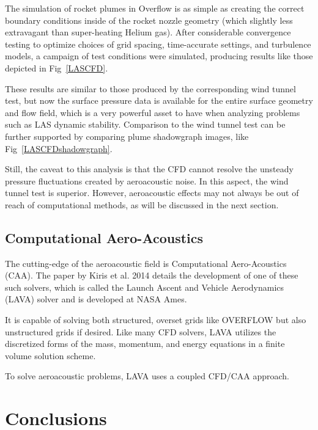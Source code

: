 \documentclass[]{aiaa-tc}%
\begin{document}
The simulation of rocket plumes in Overflow is as simple as creating the correct boundary conditions inside of the rocket nozzle geometry (which slightly less extravagant than super-heating Helium gas).  After considerable convergence testing to optimize choices of grid spacing, time-accurate settings, and turbulence models, a campaign of test conditions were simulated, producing results like those depicted in Fig~\ref{LASCFD}.

These results are similar to those produced by the corresponding wind tunnel test, but now the surface pressure data is available for the entire surface geometry and flow field, which is a very powerful asset to have when analyzing problems such as LAS dynamic stability.  Comparison to the wind tunnel test can be further supported by comparing plume shadowgraph images, like Fig~\ref{LASCFDshadowgraph}.

Still, the caveat to this analysis is that the CFD cannot resolve the unsteady pressure fluctuations created by aeroacoustic noise.  In this aspect, the wind tunnel test is superior.  However, aeroacoustic effects may not always be out of reach of computational methods, as will be discussed in the next section.

\subsection{Computational Aero-Acoustics}

The cutting-edge of the aeroacoustic field is Computational Aero-Acoustics (CAA).  The paper by Kiris et al. 2014 \cite{LAVA} details the development of one of these such solvers, which is called the Launch Ascent and Vehicle Aerodynamics (LAVA) solver and is developed at NASA Ames.

It is capable of solving both structured, overset grids like OVERFLOW but also unstructured grids if desired.  Like many CFD solvers, LAVA utilizes the discretized forms of the mass, momentum, and energy equations in a finite volume solution scheme.

To solve aeroacoustic problems, LAVA uses a coupled CFD/CAA approach.



\section{Conclusions}
\end{document}
